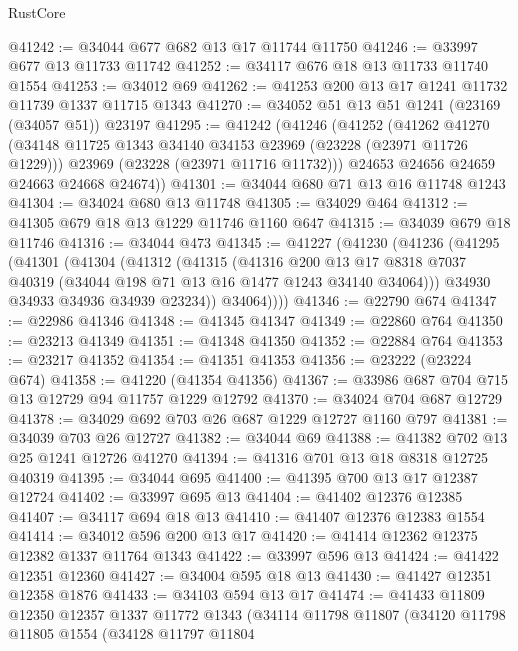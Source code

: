 \begin{lexlean}{RustCore}
\begin{coremodule}
@41242 := @34044 @677 @682 @13 @17 @11744 @11750
@41246 := @33997 @677 @13 @11733 @11742
@41252 := @34117 @676 @18 @13 @11733 @11740 @1554
@41253 := @34012 @69
@41262 := @41253 @200 @13 @17 @1241 @11732 @11739 @1337 @11715 @1343
@41270 := @34052 @51 @13 @51 @1241 (@23169 (@34057 @51)) @23197
@41295 := @41242
    (@41246
      (@41252
        (@41262
          @41270
          (@34148 @11725 @1343 @34140 @34153 @23969 (@23228 (@23971 @11726 @1229)))
          @23969
          (@23228 (@23971 @11716 @11732)))
        @24653
        @24656
        @24659
        @24663
        @24668
        @24674))
@41301 := @34044 @680 @71 @13 @16 @11748 @1243
@41304 := @34024 @680 @13 @11748
@41305 := @34029 @464
@41312 := @41305 @679 @18 @13 @1229 @11746 @1160 @647
@41315 := @34039 @679 @18 @11746
@41316 := @34044 @473
@41345 := @41227
    (@41230
      (@41236
        (@41295
          (@41301
            (@41304
              (@41312
                (@41315
                  (@41316
                    @200
                    @13
                    @17
                    @8318
                    @7037
                    @40319
                    (@34044 @198 @71 @13 @16 @1477 @1243 @34140 @34064)))
                @34930
                @34933
                @34936
                @34939
                @23234))
            @34064))))
@41346 := @22790 @674
@41347 := @22986 @41346
@41348 := @41345 @41347
@41349 := @22860 @764
@41350 := @23213 @41349
@41351 := @41348 @41350
@41352 := @22884 @764
@41353 := @23217 @41352
@41354 := @41351 @41353
@41356 := @23222 (@23224 @674)
@41358 := @41220 (@41354 @41356)
@41367 := @33986 @687 @704 @715 @13 @12729 @94 @11757 @1229 @12792
@41370 := @34024 @704 @687 @12729
@41378 := @34029 @692 @703 @26 @687 @1229 @12727 @1160 @797
@41381 := @34039 @703 @26 @12727
@41382 := @34044 @69
@41388 := @41382 @702 @13 @25 @1241 @12726 @41270
@41394 := @41316 @701 @13 @18 @8318 @12725 @40319
@41395 := @34044 @695
@41400 := @41395 @700 @13 @17 @12387 @12724
@41402 := @33997 @695 @13
@41404 := @41402 @12376 @12385
@41407 := @34117 @694 @18 @13
@41410 := @41407 @12376 @12383 @1554
@41414 := @34012 @596 @200 @13 @17
@41420 := @41414 @12362 @12375 @12382 @1337 @11764 @1343
@41422 := @33997 @596 @13
@41424 := @41422 @12351 @12360
@41427 := @34004 @595 @18 @13
@41430 := @41427 @12351 @12358 @1876
@41433 := @34103 @594 @13 @17
@41474 := @41433
    @11809
    @12350
    @12357
    @1337
    @11772
    @1343
    (@34114
      @11798
      @11807
      (@34120
        @11798
        @11805
        @1554
        (@34128
          @11797
          @11804

\end{coremodule}
\end{lexlean}
